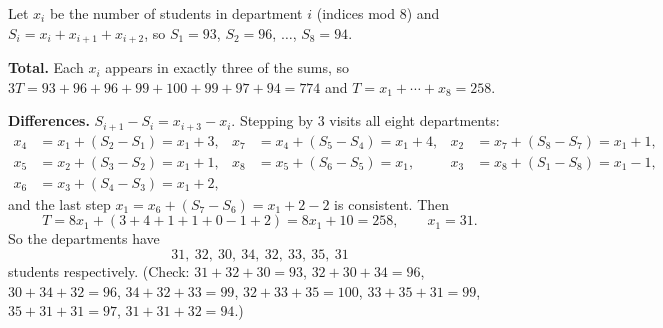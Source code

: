 Let $x_i$ be the number of students in department $i$ (indices mod $8$) and $S_i=x_i+x_{i+1}+x_{i+2}$, so $S_1=93$, $S_2=96$, $\dots$, $S_8=94$.

\textbf{Total.} Each $x_i$ appears in exactly three of the sums, so $3T=93+96+96+99+100+99+97+94=774$ and $T=x_1+\cdots+x_8=258$.

\textbf{Differences.} $S_{i+1}-S_i=x_{i+3}-x_i$. Stepping by $3$ visits all eight departments:
\begin{align*}
x_4&=x_1+(S_2-S_1)=x_1+3, & x_7&=x_4+(S_5-S_4)=x_1+4, & x_2&=x_7+(S_8-S_7)=x_1+1,\\
x_5&=x_2+(S_3-S_2)=x_1+1, & x_8&=x_5+(S_6-S_5)=x_1, & x_3&=x_8+(S_1-S_8)=x_1-1,\\
x_6&=x_3+(S_4-S_3)=x_1+2, &&&&
\end{align*}
and the last step $x_1=x_6+(S_7-S_6)=x_1+2-2$ is consistent. Then
\[T=8x_1+(3+4+1+1+0-1+2)=8x_1+10=258,\qquad x_1=31.\]
So the departments have
\[\boxed{31,\ 32,\ 30,\ 34,\ 32,\ 33,\ 35,\ 31}\]
students respectively. (Check: $31+32+30=93$, $32+30+34=96$, $30+34+32=96$, $34+32+33=99$, $32+33+35=100$, $33+35+31=99$, $35+31+31=97$, $31+31+32=94$.)
